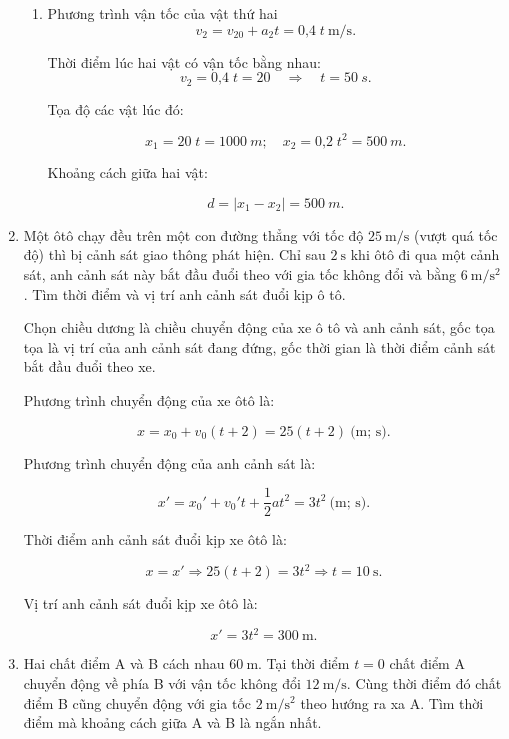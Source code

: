 \begin{enumerate}[label=\bfseries Bài \arabic*:,leftmargin=1.5cm]
{\begin{enumerate}[label=\alph*)]
		Vị trí hai xe gặp lại nhau 
		$$x_1 =x_2 =20t=\SI{2000}{m}.$$
		\item Phương trình vận tốc của vật thứ hai
		$$v_2 =v_{20}+a_2t=\text{0,4}\;t\ \text{m/s}.$$
		
		Thời điểm lúc hai vật có vận tốc bằng nhau: 
		$$v_2 =\text{0,4}\;t = 20 \quad\Rightarrow\quad t = \SI{50}{s}.$$
		
		Tọa độ các vật lúc đó: 
		
		$$x_1 = 20\;t = \SI{1000}{m};\quad x_2 = \text{0,2}\;t^2 = \SI{500}{m}.$$
		
		Khoảng cách giữa hai vật: 
		
		$$d= \left|x_1 - x_2\right| =\SI{500}{m}.$$
	\end{enumerate}
}


\item {}


{
	Một ôtô chạy đều trên một con đường thẳng với tốc độ $\SI{25}{\meter/\second}$ (vượt quá tốc độ) thì bị cảnh sát giao thông phát hiện. Chỉ sau $\SI{2}{\second}$ khi ôtô đi qua một cảnh sát, anh cảnh sát này bắt đầu đuổi theo với gia tốc không đổi và bằng $\SI{6}{\meter/\second^2}$. Tìm thời điểm và vị trí anh cảnh sát đuổi kịp ô tô.
}

\hideall
{	
	Chọn chiều dương là chiều chuyển động của xe ô tô và anh cảnh sát, gốc tọa tọa là vị trí của anh cảnh sát đang đứng, gốc thời gian là thời điểm cảnh sát bắt đầu đuổi theo xe.
	
	Phương trình chuyển động của xe ôtô là:
	
	$$x=x_0+v_0(t+2)=25(t+2)\ \text{(m; s)}.$$
	
	Phương trình chuyển động của anh cảnh sát là:
	
	$$x'=x_0'+v_0't+\dfrac{1}{2}at^2=3t^2\ \text{(m; s)}.$$
	
	Thời điểm anh cảnh sát đuổi kịp xe ôtô là:
	
	$$x=x'\Rightarrow 25(t+2)=3t^2\Rightarrow t=\SI{10}{\second}.$$
	
	Vị trí anh cảnh sát đuổi kịp xe ôtô là:
	
	$$x'=3t^2=\SI{300}{\meter}.$$
}
\item {}


{
	Hai chất điểm A và B cách nhau $\SI{60}{\meter}$. Tại thời điểm $t=0$ chất điểm A chuyển động về phía B với vận tốc không đổi $\SI{12}{\meter / \second}$. Cùng thời điểm đó chất điểm B cũng chuyển động với gia tốc $\SI{2}{\meter / \second \squared}$ theo hướng ra xa A. Tìm thời điểm mà khoảng cách giữa A và B là ngắn nhất.
}


\end{enumerate}
